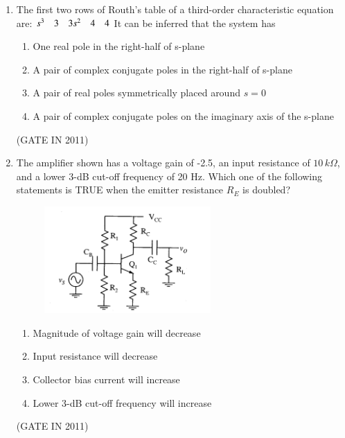 \documentclass[journal]{IEEEtran}
\begin{document}
\begin{enumerate}
\begin{multicols}{2}
\begin{enumerate}
\item The system is nonlinear
\item The system is time-invariant
\item The system is stable
\item The system has memory
\end{enumerate}
\end{multicols} \hfill(GATE IN 2011)

\item The first two rows of Routh's table of a third-order characteristic equation are:
$
s^3 \quad 3 \quad 3 \\
s^2 \quad 4 \quad 4 \\
$
It can be inferred that the system has
\begin{enumerate}
\item One real pole in the right-half of s-plane
\item A pair of complex conjugate poles in the right-half of s-plane
\item A pair of real poles symmetrically placed around $ s = 0 $
\item A pair of complex conjugate poles on the imaginary axis of the s-plane
\end{enumerate}
\hfill(GATE IN 2011)
\item The amplifier shown has a voltage gain of -2.5, an input resistance of $10\,k\Omega$, and a lower 3-dB cut-off frequency of 20 Hz. Which one of the following statements is TRUE when the emitter resistance $ R_E $ is doubled?
\begin{figure}[H]
    \centering
      \includegraphics[width=0.6\textwidth]{3.png} 
      \caption{}
    \label{fig:fig3} 
\end{figure}
\begin{multicols}{2}
\begin{enumerate}
\item Magnitude of voltage gain will decrease  
\item Input resistance will decrease  
\item Collector bias current will increase  
\item Lower 3-dB cut-off frequency will increase
\end{enumerate}
\end{multicols} \hfill(GATE IN 2011)


\end{enumerate}
\end{document}
